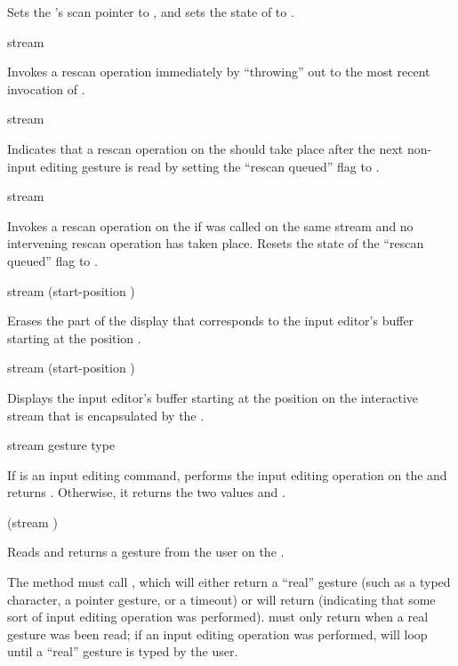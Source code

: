 Sets the  's scan pointer to
, and sets the state of  to
.

 {stream}

Invokes a rescan operation immediately by ``throwing'' out to the most recent
invocation of .

 {stream}

Indicates that a rescan operation on the 
 should take place after the next non-input editing gesture is read
by setting the ``rescan queued'' flag to .

 {stream}

Invokes a rescan operation on the   if
 was called on the same stream and no intervening rescan
operation has taken place.  Resets the state of the ``rescan queued'' flag to
.


 {stream \optional (start-position )}

Erases the part of the display that corresponds to the input editor's buffer
starting at the position .

 {stream \optional (start-position )}

Displays the input editor's buffer starting at the position 
on the interactive stream that is encapsulated by the  .


 {stream gesture type}

If  is an input editing command, 
performs the input editing operation on the 
 and returns .  Otherwise, it returns the two values
 and .

 {(stream ) \key}

Reads and returns a gesture from the user on the 
.

The  method must call , which
will either return a ``real'' gesture (such as a typed character, a pointer
gesture, or a timeout) or will return  (indicating that some sort of
input editing operation was performed).   must only
return when a real gesture was been read; if an input editing operation was
performed,  will loop until a ``real'' gesture is
typed by the user.

